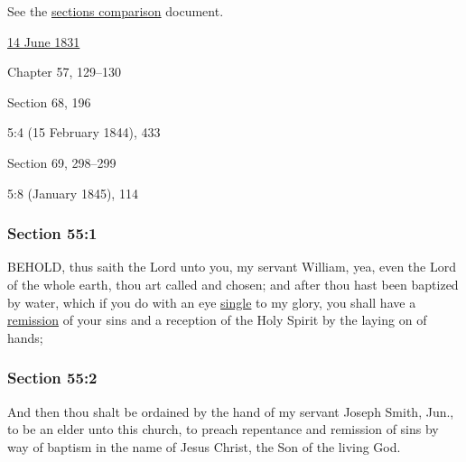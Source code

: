 		See the \href{https://drive.google.com/file/d/1goAvNz8jS4R8slYfMG_db55Ty2z_vmgK/view?usp=sharing}{sections comparison} document.
	
		\begin{compactdesc}
			\item[JSP] \hyperref[EMS-1831-JS-14-JUN-1831]{14 June 1831}
			\item[BC] Chapter 57, 129--130
			\item[DC 1835] Section 68, 196
			\item[TS] 5:4 (15 February 1844), 433
			\item[DC 1844] Section 69, 298--299
			\item[MS] 5:8 (January 1845), 114
		\end{compactdesc}

	\subsubsection{Section 55:1} %
		\label{DC55-1}

		BEHOLD, thus saith the Lord unto you, my servant William, yea, even the Lord of the whole earth, thou art called and chosen; and after thou hast been baptized by water, which if you do with an eye \hyperref[SINGLE]{single} to my glory, you shall have a \hyperref[REMISSION]{remission} of your sins and a reception of the Holy Spirit by the laying on of hands;


	\subsubsection{Section 55:2} %
		\label{DC55-2}

		And then thou shalt be ordained by the hand of my servant Joseph Smith, Jun., to be an elder unto this church, to preach repentance and remission of sins by way of baptism in the name of Jesus Christ, the Son of the living God.


